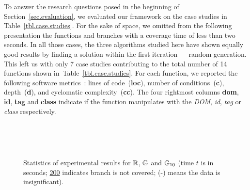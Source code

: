 To answer the research questions posed in the beginning of Section~\ref{sec.evaluation}, we evaluated our framework on the case studies in Table~\ref{tbl.case.studies}. For the sake of space, we omitted from the following presentation the functions and branches with a coverage time of less than two seconds. In all those cases, the three algorithms studied here have shown equally good results by finding a solution within the first iteration --- random generation. This left us with only 7 case studies contributing to the total number of 14 functions  shown in~Table~\ref{tbl.case.studies}. For each function, we reported the following software metrics~\cite{jsmeter}: lines of code~(\textbf{loc}), number of conditions~(\textbf{c}), depth~(\textbf{d}), and cyclomatic complexity~(\textbf{cc}). The four rightmost columns \textbf{dom}, \textbf{id}, \textbf{tag} and \textbf{class} indicate if the function manipulates with the \emph{DOM}, \emph{id}, \emph{tag} or \emph{class} respectively.

\begin{figure*}[!t]
\centering
\begin{minipage}[c]{.43\linewidth}
\centering
{}\\
\\
\\
\begin{minipage}[c]{.6\linewidth}
\subfloat[Time $t$]{
  \centering
  
  \label{fig.gen.time.comp}
}
\end{minipage}
\hfill
\begin{minipage}[c]{.3\linewidth}
\subfloat[Speed $t/i$]{
  \centering
  
  \label{fig.get.cost}
}
\end{minipage}
\end{minipage}
\hfill
\begin{minipage}[c]{.55\linewidth}
\end{minipage}
\caption{Statistics of experimental results for $\mathbb{R}$, $\mathbb{G}$ and $\mathbb{G}_{10}$ (time $t$ is in seconds; \underline{200} indicates branch is not covered; (-) means the data is insignificant).}
\label{lab3}
\end{figure*}



